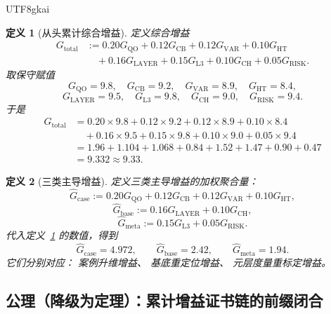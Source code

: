 \documentclass[12pt]{article}
\newtheorem{definition}{定义}[section]
\begin{document}
\begin{CJK*}{UTF8}{gkai}
\begin{definition}[从头累计综合增益]
\label{def:tex1-ch6-total}
定义综合增益
\[
  \begin{aligned}
    G_{\mathrm{total}}
    &:=
    0.20G_{\mathrm{QO}}
    +0.12G_{\mathrm{CB}}
    +0.12G_{\mathrm{VAR}}
    +0.10G_{\mathrm{HT}} \\
    &\quad
    +0.16G_{\mathrm{LAYER}}
    +0.15G_{\mathrm{L3}}
    +0.10G_{\mathrm{CH}}
    +0.05G_{\mathrm{RISK}}.
  \end{aligned}
\]
取保守赋值
\[
  G_{\mathrm{QO}}=9.8,\quad
  G_{\mathrm{CB}}=9.2,\quad
  G_{\mathrm{VAR}}=8.9,\quad
  G_{\mathrm{HT}}=8.4,
\]
\[
  G_{\mathrm{LAYER}}=9.5,\quad
  G_{\mathrm{L3}}=9.8,\quad
  G_{\mathrm{CH}}=9.0,\quad
  G_{\mathrm{RISK}}=9.4.
\]
于是
\[
\begin{aligned}
  G_{\mathrm{total}}
  &=
  0.20\times 9.8
  +0.12\times 9.2
  +0.12\times 8.9
  +0.10\times 8.4 \\
  &\quad
  +0.16\times 9.5
  +0.15\times 9.8
  +0.10\times 9.0
  +0.05\times 9.4 \\
  &=1.96+1.104+1.068+0.84+1.52+1.47+0.90+0.47 \\
  &=9.332 \approx 9.33.
\end{aligned}
\]
\end{definition}

\begin{definition}[三类主导增益]
\label{def:tex1-ch6-derived}
定义三类主导增益的加权聚合量：
\[
  \widehat G_{\mathrm{case}}
  :=
  0.20G_{\mathrm{QO}}
  +0.12G_{\mathrm{CB}}
  +0.12G_{\mathrm{VAR}}
  +0.10G_{\mathrm{HT}},
\]
\[
  \widehat G_{\mathrm{base}}
  :=
  0.16G_{\mathrm{LAYER}}+0.10G_{\mathrm{CH}},
\]
\[
  \widehat G_{\mathrm{meta}}
  :=
  0.15G_{\mathrm{L3}}+0.05G_{\mathrm{RISK}}.
\]
代入定义~\ref{def:tex1-ch6-total} 的数值，得到
\[
  \widehat G_{\mathrm{case}}=4.972,\qquad
  \widehat G_{\mathrm{base}}=2.42,\qquad
  \widehat G_{\mathrm{meta}}=1.94.
\]
它们分别对应：
案例升维增益、
基底重定位增益、
元层度量重标定增益。
\end{definition}

\subsection{公理（降级为定理）：累计增益证书链的前缀闭合}
\label{subsec:tex1-ch6-axiom}


\end{CJK*}
\end{document}
